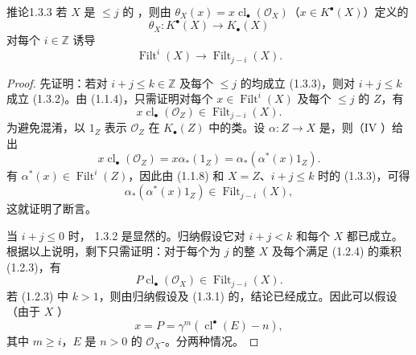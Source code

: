 \begin{SGAresult}{推论}{1.3.3}
若 $X$ 是 $\leq j$ 的  ，则由 $\theta_X(x)=x\operatorname{cl}_\bullet(\mathcal O_X)$（$x\in K^\bullet(X)$）定义的
\[\theta_X:K^\bullet(X)\longrightarrow K_\bullet(X)\]
对每个 $i\in\mathbb Z$ 诱导
\[\operatorname{Filt}^i(X)\longrightarrow\operatorname{Filt}_{j-i}(X).\]
\end{SGAresult}
\begin{proof}
先证明：若对 $i+j\leq k\in\mathbb Z$ 及每个 $\leq j$ 的均成立 (1.3.3)，则对 $i+j\leq k$ 成立 (1.3.2)。由 (1.1.4)，只需证明对每个 $x\in\operatorname{Filt}^i(X)$ 及每个 $\leq j$ 的 $Z$，有
\[x\operatorname{cl}_\bullet(\mathcal O_Z)\in\operatorname{Filt}_{j-i}(X).\]
为避免混淆，以 $1_Z$ 表示 $\mathcal O_Z$ 在 $K_\bullet(Z)$ 中的类。设 $\alpha:Z\longrightarrow X$ 是，则（IV ）给出
\[x\operatorname{cl}_\bullet(\mathcal O_Z)=x\alpha_*(1_Z)=\alpha_*(\alpha^*(x)1_Z).\]
有 $\alpha^*(x)\in\operatorname{Filt}^i(Z)$，因此由 (1.1.8) 和 $X=Z$、$i+j\leq k$ 时的 (1.3.3)，可得
\[\alpha_*(\alpha^*(x)1_Z)\in\operatorname{Filt}_{j-i}(X),\]
这就证明了断言。

当 $i+j\leq0$ 时， 1.3.2 是显然的。归纳假设它对 $i+j<k$ 和每个   $X$ 都已成立。根据以上说明，剩下只需证明：对于每个为 $j$ 的整   $X$ 及每个满足 (1.2.4) 的乘积 (1.2.3)，有
\[P\operatorname{cl}_\bullet(\mathcal O_X)\in\operatorname{Filt}_{j-i}(X).\tag{1.3.4}\]
若 (1.2.3) 中 $k>1$，则由归纳假设及 (1.3.1) 的，结论已经成立。因此可以假设（由于 $X$ ）
\[x=P=\gamma^m(\operatorname{cl}^\bullet(E)-n),\tag{1.3.5}\]
其中 $m\geq i$，$E$ 是 $n>0$ 的 $\mathcal O_X$-。分两种情况。


\end{proof}
